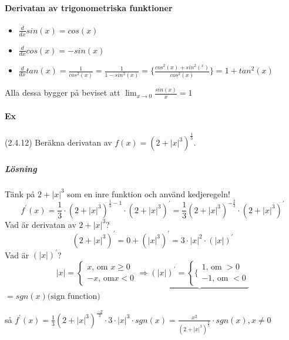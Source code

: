 \paragraph{Derivatan av trigonometriska funktioner}
\begin{itemize}
    \item $\frac{d}{dx}sin(x)=cos(x)$
    \item $\frac{d}{dx}cos(x)=-sin(x)$
    \item $\frac{d}{dx}tan(x)=\frac{1}{cos^2(x)}=\frac{1}{1-sin^2(x)}=\{\frac{cos^2(x)+sin^2(^x)}{cos^2(x)}\}=1+tan^2(x)$
\end{itemize}
Alla dessa bygger på beviset att $\lim_{x\to 0}\frac{sin(x)}{x}=1$

\paragraph{Ex} (2.4.12)
Beräkna derivatan av $f(x)=(2+|x|^3)^{\frac{1}{3}}$.
\subparagraph{Lösning}
Tänk på $2+|x|^3$ som en inre funktion och använd kedjeregeln!
\begin{equation*}
    f^\prime(x)=\frac{1}{3}\cdot (2+|x|^3)^{\frac{1}{3}-1}\cdot(2+|x|^3)^\prime=
    \frac{1}{3}(2+|x|^3)^{-\frac{2}{3}}\cdot(2+|x|^3)^\prime
\end{equation*}
Vad är derivatan av $2+|x|^3$?
\begin{equation*}
    (2+|x|^3)^\prime=0+(|x|^3)^\prime=
    3\cdot|x|^2\cdot(|x|)^\prime
\end{equation*}
Vad är $(|x|)^\prime$?
\begin{equation*}
    |x|=\left\lbrace\begin{matrix}
        x\text{, om } x\geq 0 \\
        -x\text{, om} x < 0
    \end{matrix}\right.
    \Rightarrow
    \underbrace{(|x|)^\prime=\left\lbrace\{\begin{matrix}
            1\text{, om } > 0 \\
            -1\text{, om } < 0
        \end{matrix}\right.}
\end{equation*}
$=sgn(x) \text{(sign function)}$

så $f^\prime(x)=\frac{1}{3}(2+|x|^3)^\frac{-2}{3}\cdot 3\cdot|x|^3\cdot sgn(x)=
    \frac{x^2}{(2+|x|^3)^\frac{2}{3}}\cdot sgn(x),x\neq 0$